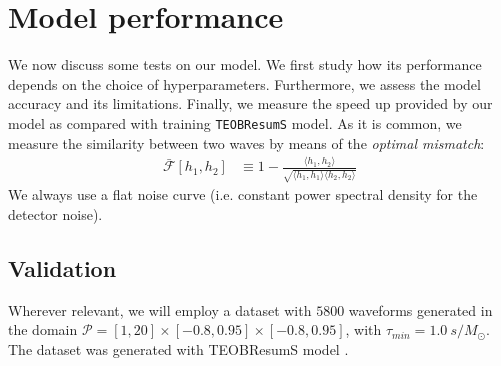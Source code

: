 \section{Model performance}
\label{sec:performance}
We now discuss some tests on our model. We first study how its performance depends on the choice of hyperparameters. Furthermore, we assess the model accuracy and its limitations.
Finally, we measure the speed up provided by our model as compared with training \texttt{TEOBResumS} model.
As it is common, we measure the similarity between two waves by means of the \textit{optimal mismatch}:
\begin{align}
	\bar{\mathcal{F}}[h_1,h_2] &\equiv 1- \frac{\langle h_1, h_2 \rangle}{\sqrt{\langle h_1, h_1 \rangle \langle h_2, h_2 \rangle}}	\label{eq:mismatch_def}
\end{align}
We always use a flat noise curve (i.e. constant power spectral density for the detector noise).



\subsection{Validation}
Wherever relevant, we will employ a dataset with $5800$ waveforms generated in the domain $\mathcal{P} = [1,20]\times[-0.8,0.95]\times[-0.8,0.95]$, with $\tau_{min} = \SI{1.0}{s/M_\odot}$. The dataset was generated with TEOBResumS model \cite{}.

